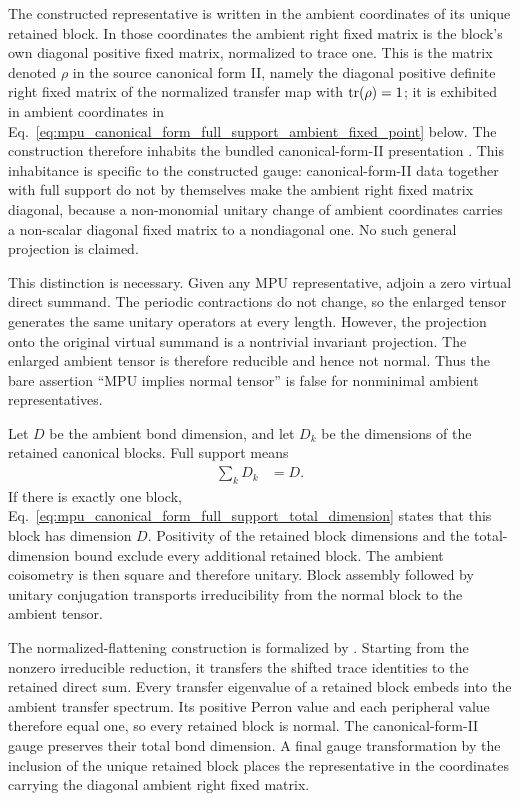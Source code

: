 \documentclass{article}
\begin{document}
The constructed representative is written in the ambient coordinates of its
unique retained block. In those coordinates the ambient right fixed matrix is
the block's own diagonal positive fixed matrix, normalized to trace one. This
is the matrix denoted $\rho$ in the source canonical form II, namely the
diagonal positive definite right fixed matrix of the normalized transfer map
with $\operatorname{tr}(\rho)=1$; it is exhibited in ambient coordinates in
Eq.~\ref{eq:mpu_canonical_form_full_support_ambient_fixed_point} below. The
construction
therefore inhabits the bundled canonical-form-II presentation
. This inhabitance is specific to the
constructed gauge: canonical-form-II data together with full support do not by
themselves make the ambient right fixed matrix diagonal, because a
non-monomial unitary change of ambient coordinates carries a non-scalar
diagonal fixed matrix to a nondiagonal one. No such general projection is
claimed.

This distinction is necessary. Given any MPU representative, adjoin a zero
virtual direct summand. The periodic contractions do not change, so the
enlarged tensor generates the same unitary operators at every length. However,
the projection onto the original virtual summand is a nontrivial invariant
projection. The enlarged ambient tensor is therefore reducible and hence not
normal. Thus the bare assertion ``MPU implies normal tensor'' is false for
nonminimal ambient representatives.

Let $D$ be the ambient bond dimension, and let $D_k$ be the dimensions of the
retained canonical blocks. Full support means
\begin{align}
    \sum_k D_k & = D.
    \label{eq:mpu_canonical_form_full_support_total_dimension}
\end{align}
If there is exactly one block,
Eq.~\ref{eq:mpu_canonical_form_full_support_total_dimension} states that this
block has dimension $D$. Positivity of the retained block dimensions and the
total-dimension bound exclude every additional retained block. The ambient
coisometry is then square and therefore unitary. Block assembly followed by
unitary conjugation transports irreducibility from the normal block to the
ambient tensor.

The normalized-flattening construction is formalized by
. Starting
from the nonzero irreducible reduction, it transfers the shifted trace
identities to the retained direct sum. Every transfer eigenvalue of a retained
block embeds into the ambient transfer spectrum. Its positive Perron value and
each peripheral value therefore equal one, so every retained block is normal.
The canonical-form-II gauge preserves their total bond dimension. A final
gauge transformation by the inclusion of the unique retained block places the
representative in the coordinates carrying the diagonal ambient right fixed
matrix.
\end{document}
